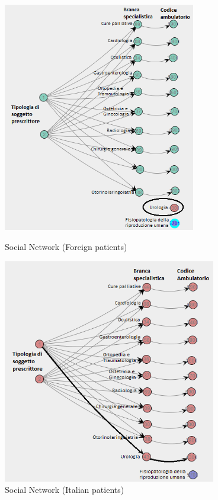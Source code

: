 \begin{figure} [htbp]
\begin{minipage}[t]{0.5\textwidth}
\includegraphics[width=0.75\textwidth, keepaspectratio]{AmbulatoriSocialNetworkForeigns}
\caption{Social Network (Foreign patients)}
\end{minipage}
\begin{minipage}[t]{0.5\textwidth}
\includegraphics[width=0.83\textwidth, keepaspectratio]{AmbulatoriSocialNetworkItalians}
\caption{Social Network (Italian patients)}
\end{minipage}
\end{figure}
